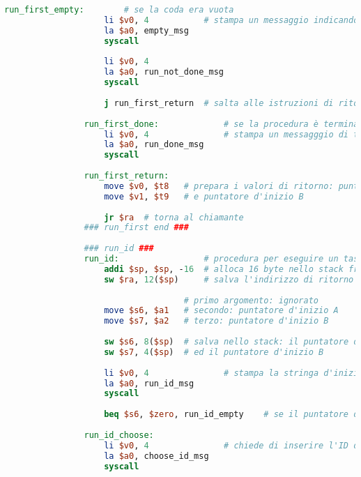 \begin{center}
\begin{lstlisting}[language=mips, gobble=14, stepnumber=1]
                run_first_empty:		# se la coda era vuota
                    li $v0, 4			# stampa un messaggio indicando l'errore
                    la $a0, empty_msg
                    syscall
                    
                    li $v0, 4
                    la $a0, run_not_done_msg
                    syscall
                    
                    j run_first_return	# salta alle istruzioni di ritorno
                
                run_first_done:				# se la procedura è terminata con successo
                    li $v0, 4				# stampa un messagggio di terminazione
                    la $a0, run_done_msg
                    syscall
                    
                run_first_return:
                    move $v0, $t8	# prepara i valori di ritorno: puntatore d'inizio A
                    move $v1, $t9	# e puntatore d'inizio B
                
                    jr $ra	# torna al chiamante
                ### run_first end ###
                
                ### run_id ###
                run_id:					# procedura per eseguire un task specifico
                    addi $sp, $sp, -16	# alloca 16 byte nello stack frame (4 word)
                    sw $ra, 12($sp)		# salva l'indirizzo di ritorno nello stack
                
                					# primo argomento: ignorato
                    move $s6, $a1	# secondo: puntatore d'inizio A
                    move $s7, $a2	# terzo: puntatore d'inizio B
                    
                    sw $s6, 8($sp)	# salva nello stack: il puntatore d'inizio A
                    sw $s7, 4($sp)	# ed il puntatore d'inizio B
                
                    li $v0, 4               # stampa la stringa d'inizio dell'esecuzione di un task specifico
                    la $a0, run_id_msg
                    syscall
                    
                    beq $s6, $zero, run_id_empty	# se il puntatore d'inizio è nullo, allora la coda è vuota
                    
                run_id_choose:
                    li $v0, 4				# chiede di inserire l'ID del task da eseguire
                    la $a0, choose_id_msg
                    syscall
                    

\end{lstlisting}
\end{center}
